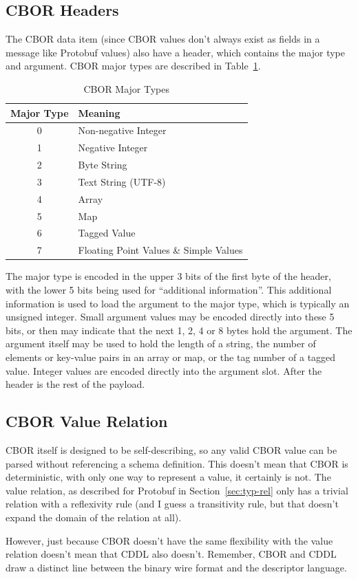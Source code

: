 \subsection{CBOR Headers}

The CBOR data item (since CBOR values don't always exist as fields in a message
like Protobuf values) also have a header, which contains the major type and
argument. CBOR major types are described in Table~\ref{tab:cbor-major-type}.

\begin{table}[htbp]
  \centering
  \begin{tabular}{cl}
    \toprule
    Major Type & Meaning \\
    \midrule
    0 & Non-negative Integer \\
    1 & Negative Integer \\
    2 & Byte String \\
    3 & Text String (UTF-8) \\
    4 & Array \\
    5 & Map \\
    6 & Tagged Value \\
    7 & Floating Point Values \& Simple Values \\
    \bottomrule
  \end{tabular}
\caption{CBOR Major Types}
\label{tab:cbor-major-type}
\end{table}

The major type is encoded in the upper 3 bits of the first byte of the header,
with the lower 5 bits being used for ``additional information''. This additional
information is used to load the argument to the major type, which is typically
an unsigned integer. Small argument values may be encoded directly into these 5
bits, or then may indicate that the next 1, 2, 4 or 8 bytes hold the
argument. The argument itself may be used to hold the length of a string, the
number of elements or key-value pairs in an array or map, or the tag number of a
tagged value. Integer values are encoded directly into the argument slot. After
the header is the rest of the payload. 

\subsection{CBOR Value Relation}

CBOR itself is designed to be self-describing, so any valid CBOR value can be
parsed without referencing a schema definition. This doesn't mean that CBOR is
deterministic, with only one way to represent a value, it certainly is not. The
value relation, as described for Protobuf in Section~\ref{sec:typ-rel} only has
a trivial relation with a reflexivity rule (and I guess a transitivity rule, but
that doesn't expand the domain of the relation at all).

However, just because CBOR doesn't have the same flexibility with the value
relation doesn't mean that CDDL also doesn't. Remember, CBOR and CDDL draw a
distinct line between the binary wire format and the descriptor language.


